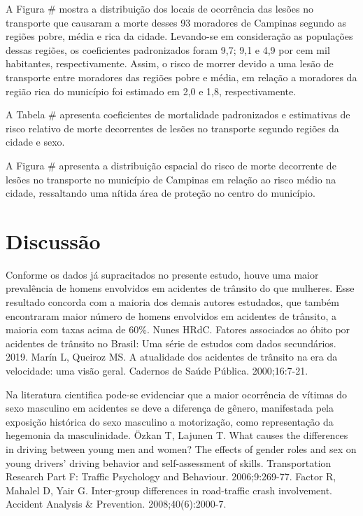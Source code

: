 A Figura \# mostra a distribuição dos locais de ocorrência das lesões no transporte que causaram a morte desses 93 moradores de Campinas segundo as regiões pobre, média e rica da cidade. Levando-se em consideração as populações dessas regiões, os coeficientes padronizados foram 9,7; 9,1 e 4,9 por cem mil habitantes, respectivamente. Assim, o risco de morrer devido a uma lesão de transporte entre moradores das regiões pobre e média, em relação a moradores da região rica do município foi estimado em 2,0 e 1,8, respectivamente.

A Tabela \# apresenta coeficientes de mortalidade padronizados e estimativas de risco relativo de morte decorrentes de lesões no transporte segundo regiões da cidade e sexo.

A Figura \# apresenta a distribuição espacial do risco de morte decorrente de lesões no transporte no município de Campinas em relação ao risco médio na cidade, ressaltando uma nítida área de proteção no centro do município.

\section{Discussão}

Conforme os dados já supracitados no presente estudo, houve uma maior prevalência de homens envolvidos em acidentes de trânsito do que mulheres. Esse resultado concorda com a maioria dos demais autores estudados, que também encontraram maior número de homens envolvidos em acidentes de trânsito, a maioria com taxas acima de 60\%. Nunes HRdC. Fatores associados ao óbito por acidentes de trânsito no Brasil: Uma série de estudos com dados secundários. 2019. Marín L, Queiroz MS. A atualidade dos acidentes de trânsito na era da velocidade: uma visão geral. Cadernos de Saúde Pública. 2000;16:7-21.

Na literatura cientifica pode-se evidenciar que a maior ocorrência de vítimas do sexo masculino em acidentes se deve a diferença de gênero, manifestada pela exposição histórica do sexo masculino a motorização, como representação da hegemonia da masculinidade.  Özkan T, Lajunen T. What causes the differences in driving between young men and women? The effects of gender roles and sex on young drivers' driving behavior and self-assessment of skills. Transportation Research Part F: Traffic Psychology and Behaviour. 2006;9:269-77. Factor R, Mahalel D, Yair G. Inter-group differences in road-traffic crash involvement. Accident Analysis & Prevention. 2008;40(6):2000-7.

